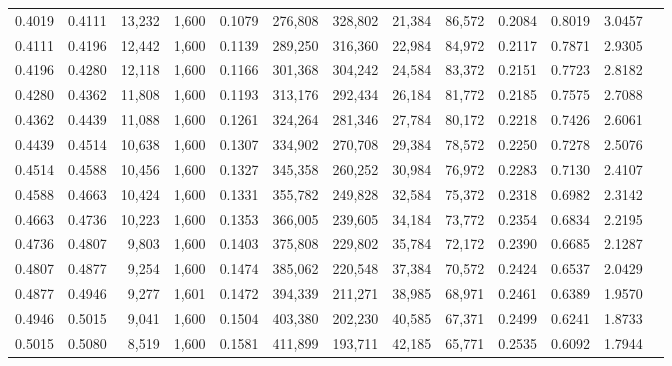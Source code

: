 \begin{tabular}{rrrrrrrrrrrrr}
0.4019 & 0.4111 & 13,232 & 1,600 &                                     0.1079 & 276,808 & 328,802 &  21,384 &  86,572 & 0.2084 & 0.8019 & 3.0457 \\
0.4111 & 0.4196 & 12,442 & 1,600 &                                     0.1139 & 289,250 & 316,360 &  22,984 &  84,972 & 0.2117 & 0.7871 & 2.9305 \\
0.4196 & 0.4280 & 12,118 & 1,600 &                                     0.1166 & 301,368 & 304,242 &  24,584 &  83,372 & 0.2151 & 0.7723 & 2.8182 \\
0.4280 & 0.4362 & 11,808 & 1,600 &                                     0.1193 & 313,176 & 292,434 &  26,184 &  81,772 & 0.2185 & 0.7575 & 2.7088 \\
0.4362 & 0.4439 & 11,088 & 1,600 &                                     0.1261 & 324,264 & 281,346 &  27,784 &  80,172 & 0.2218 & 0.7426 & 2.6061 \\
0.4439 & 0.4514 & 10,638 & 1,600 &                                     0.1307 & 334,902 & 270,708 &  29,384 &  78,572 & 0.2250 & 0.7278 & 2.5076 \\
0.4514 & 0.4588 & 10,456 & 1,600 &                                     0.1327 & 345,358 & 260,252 &  30,984 &  76,972 & 0.2283 & 0.7130 & 2.4107 \\
0.4588 & 0.4663 & 10,424 & 1,600 &                                     0.1331 & 355,782 & 249,828 &  32,584 &  75,372 & 0.2318 & 0.6982 & 2.3142 \\
0.4663 & 0.4736 & 10,223 & 1,600 &                                     0.1353 & 366,005 & 239,605 &  34,184 &  73,772 & 0.2354 & 0.6834 & 2.2195 \\
0.4736 & 0.4807 &  9,803 & 1,600 &                                     0.1403 & 375,808 & 229,802 &  35,784 &  72,172 & 0.2390 & 0.6685 & 2.1287 \\
0.4807 & 0.4877 &  9,254 & 1,600 &                                     0.1474 & 385,062 & 220,548 &  37,384 &  70,572 & 0.2424 & 0.6537 & 2.0429 \\
0.4877 & 0.4946 &  9,277 & 1,601 &                                     0.1472 & 394,339 & 211,271 &  38,985 &  68,971 & 0.2461 & 0.6389 & 1.9570 \\
0.4946 & 0.5015 &  9,041 & 1,600 &                                     0.1504 & 403,380 & 202,230 &  40,585 &  67,371 & 0.2499 & 0.6241 & 1.8733 \\
0.5015 & 0.5080 &  8,519 & 1,600 &                                     0.1581 & 411,899 & 193,711 &  42,185 &  65,771 & 0.2535 & 0.6092 & 1.7944 \\

\end{tabular}

